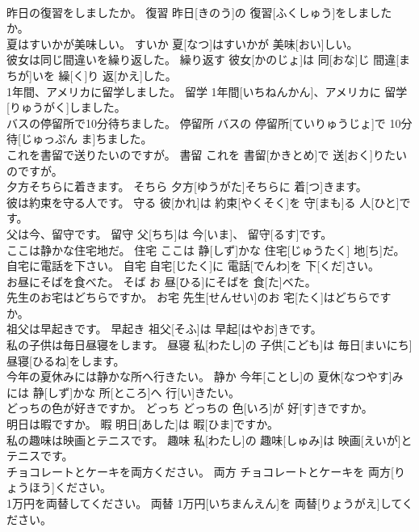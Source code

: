 \documentclass[8pt]{extreport}
\begin{document}
\begin{CJK}{UTF8}{min}
\\	昨日の復習をしましたか。	復習	昨日[きのう]の 復習[ふくしゅう]をしましたか。	
\\	夏はすいかが美味しい。	すいか	夏[なつ]はすいかが 美味[おい]しい。	
\\	彼女は同じ間違いを繰り返した。	繰り返す	彼女[かのじょ]は 同[おな]じ 間違[まちが]いを 繰[く]り 返[かえ]した。	
\\	1年間、アメリカに留学しました。	留学	1年間[いちねんかん]、アメリカに 留学[りゅうがく]しました。	
\\	バスの停留所で10分待ちました。	停留所	バスの 停留所[ていりゅうじょ]で 10分待[じゅっぷん ま]ちました。	
\\	これを書留で送りたいのですが。	書留	これを 書留[かきとめ]で 送[おく]りたいのですが。	
\\	夕方そちらに着きます。	そちら	夕方[ゆうがた]そちらに 着[つ]きます。	
\\	彼は約束を守る人です。	守る	彼[かれ]は 約束[やくそく]を 守[まも]る 人[ひと]です。	
\\	父は今、留守です。	留守	父[ちち]は 今[いま]、 留守[るす]です。	
\\	ここは静かな住宅地だ。	住宅	ここは 静[しず]かな 住宅[じゅうたく] 地[ち]だ。	
\\	自宅に電話を下さい。	自宅	自宅[じたく]に 電話[でんわ]を 下[くだ]さい。	
\\	お昼にそばを食べた。	そば	お 昼[ひる]にそばを 食[た]べた。	
\\	先生のお宅はどちらですか。	お宅	先生[せんせい]のお 宅[たく]はどちらですか。	
\\	祖父は早起きです。	早起き	祖父[そふ]は 早起[はやお]きです。	
\\	私の子供は毎日昼寝をします。	昼寝	私[わたし]の 子供[こども]は 毎日[まいにち] 昼寝[ひるね]をします。	
\\	今年の夏休みには静かな所へ行きたい。	静か	今年[ことし]の 夏休[なつやす]みには 静[しず]かな 所[ところ]へ 行[い]きたい。	
\\	どっちの色が好きですか。	どっち	どっちの 色[いろ]が 好[す]きですか。	
\\	明日は暇ですか。	暇	明日[あした]は 暇[ひま]ですか。	
\\	私の趣味は映画とテニスです。	趣味	私[わたし]の 趣味[しゅみ]は 映画[えいが]とテニスです。	
\\	チョコレートとケーキを両方ください。	両方	チョコレートとケーキを 両方[りょうほう]ください。	
\\	1万円を両替してください。	両替	1万円[いちまんえん]を 両替[りょうがえ]してください。	

\end{CJK}
\end{document}
